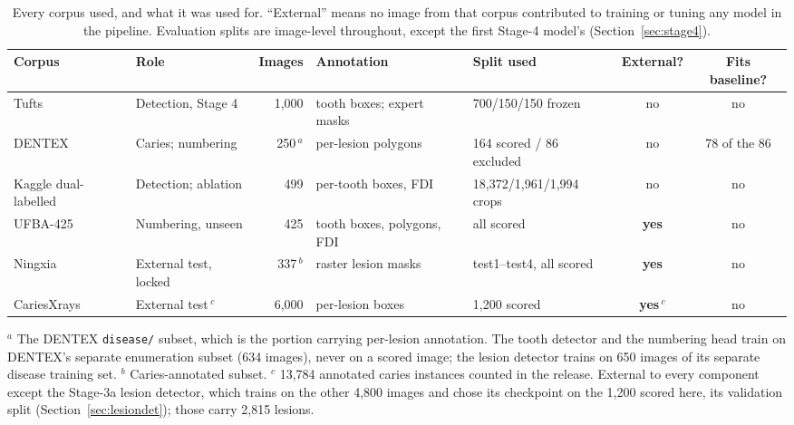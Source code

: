 \documentclass[conference]{IEEEtran}
\begin{document}
\begin{table}[t]
\caption{Every corpus used, and what it was used for. ``External'' means no
image from that corpus contributed to training or tuning any model in the
pipeline. Evaluation splits are image-level throughout, except the first Stage-4
model's (Section~\ref{sec:stage4}).}
\label{tab:data}
\centering
\footnotesize
\begin{tabular}{llrllcc}
\toprule
Corpus & Role & Images & Annotation & Split used &
External? & Fits baseline? \\
\midrule
Tufts~\cite{panetta2022tufts} & Detection, Stage 4 & 1{,}000 &
tooth boxes; expert masks & 700/150/150 frozen & no & no \\
DENTEX~\cite{hamamci2023dentex} & Caries; numbering & 250\,$^{a}$ &
per-lesion polygons & 164 scored / 86 excluded & no & 78 of the 86 \\
Kaggle dual-labelled & Detection; ablation & 499 &
per-tooth boxes, FDI & 18{,}372/1{,}961/1{,}994 crops & no & no \\
UFBA-425~\cite{budagam2024oralbbnet} & Numbering, unseen & 425 &
tooth boxes, polygons, FDI & all scored & \textbf{yes} & no \\
Ningxia~\cite{li2024multicenter} & External test, locked & 337\,$^{b}$ &
raster lesion masks & test1--test4, all scored & \textbf{yes} & no \\
CariesXrays~\cite{chen2024cariesxrays} & External test\,$^{c}$ & 6{,}000 &
per-lesion boxes & 1{,}200 scored & \textbf{yes}\,$^{c}$ & no \\
\bottomrule
\end{tabular}

\vspace{2pt}
\raggedright\footnotesize
$^{a}$ The DENTEX \texttt{disease/} subset, which is the portion carrying
per-lesion annotation. The tooth detector and the numbering head train on
DENTEX's separate enumeration subset (634 images), never on a scored image; the
lesion detector trains on 650 images of its separate disease training set. \quad
$^{b}$ Caries-annotated subset. \quad
$^{c}$ 13{,}784 annotated caries instances counted in the release. External to
every component except the Stage-3a lesion detector, which trains on the other
4{,}800 images and chose its checkpoint on the 1{,}200 scored here, its validation
split (Section~\ref{sec:lesiondet}); those carry 2{,}815 lesions.
\end{table}
\end{document}
